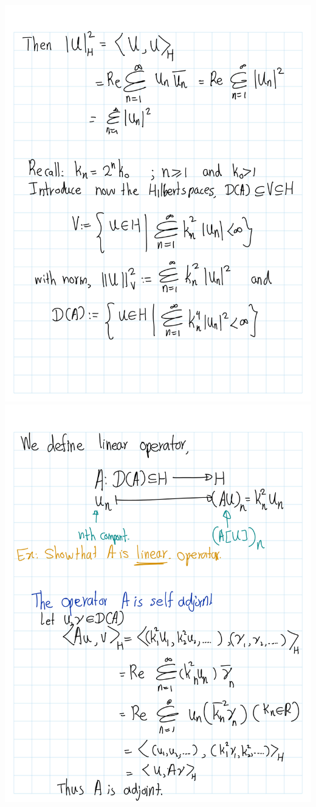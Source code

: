 \documentclass[
]{book}
\theoremstyle{definition}
\theoremstyle{definition}
\theoremstyle{definition}
\theoremstyle{definition}
\theoremstyle{remark}
\begin{document}
\includegraphics[width=18cm,height=\textheight]{fig/Book/fig book-3.png}
\includegraphics[width=18cm,height=\textheight]{fig/Book/fig book-4.png}
\end{document}
